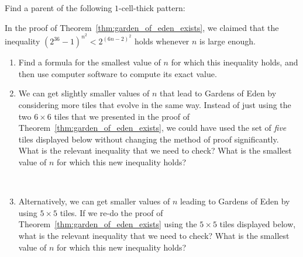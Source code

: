 \begin{multicols}{2}
\begin{problem}
		\begin{center}
		\end{center}
	\end{problem}

	
	\mfilbreak
	
	
	\begin{problem}\label{exer:goe_height_1_exercise} 
		Find a parent of the following $1$-cell-thick pattern: \\[0.04em]
		
		\begin{center}
			\vspace*{-1em}
		\end{center}
	\end{problem}
	
	
	\mfilbreak
	
	
	\begin{problemstar}\label{exer:goe_theorem} 
		In the proof of Theorem~\ref{thm:garden_of_eden_exists}, we claimed that the inequality $(2^{36}-1)^{n^2} < 2^{(6n-2)^2}$ holds whenever $n$ is large enough.\smallskip
		
		\begin{enumerate}[label=\bf\color{ocre}(\alph*)]
			\item Find a formula for the smallest value of $n$ for which this inequality holds, and then use computer software to compute its exact value.
			
			\item We can get slightly smaller values of $n$ that lead to Gardens of Eden by considering more tiles that evolve in the same way. Instead of just using the two $6 \times 6$ tiles that we presented in the proof of Theorem~\ref{thm:garden_of_eden_exists}, we could have used the set of \emph{five} tiles displayed below without changing the method of proof significantly. What is the relevant inequality that we need to check? What is the smallest value of $n$ for which this new inequality holds?
			
			\begin{center}
				\\[1em]
			\end{center}
			
			\item Alternatively, we can get smaller values of $n$ leading to Gardens of Eden by using $5 \times 5$ tiles. If we re-do the proof of Theorem~\ref{thm:garden_of_eden_exists} using the $5 \times 5$ tiles displayed below, what is the relevant inequality that we need to check? What is the smallest value of $n$ for which this new inequality holds?
			

\end{enumerate}
\end{problemstar}
\end{multicols}
